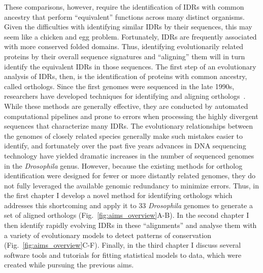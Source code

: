 These comparisons, however, require the identification of IDRs with common ancestry that perform ``equivalent'' functions across many distinct organisms. Given the difficulties with identifying similar IDRs by their sequences, this may seem like a chicken and egg problem. Fortunately, IDRs are frequently associated with more conserved folded domains. Thus, identifying evolutionarily related proteins by their overall sequence signatures and ``aligning'' them will in turn identify the equivalent IDRs in those sequences. The first step of an evolutionary analysis of IDRs, then, is the identification of proteins with common ancestry, called orthologs. Since the first genomes were sequenced in the late 1990s, researchers have developed techniques for identifying and aligning orthologs~\cite{Fleischmann1995, Goffeau1996, CESC1998, Tatusov1997}. While these methods are generally effective, they are conducted by automated computational pipelines and prone to errors when processing the highly divergent sequences that characterize many IDRs. The evolutionary relationships between the genomes of closely related species generally make such mistakes easier to identify, and fortunately over the past five years advances in DNA sequencing technology have yielded dramatic increases in the number of sequenced genomes in the \textit{Drosophila} genus. However, because the existing methods for ortholog identification were designed for fewer or more distantly related genomes, they do not fully leveraged the available genomic redundancy to minimize errors. Thus, in the first chapter I develop a novel method for identifying orthologs which addresses this shortcoming and apply it to 33 \textit{Drosophila} genomes to generate a set of aligned orthologs (Fig.~\ref{fig:aims_overview}A-B). In the second chapter I then identify rapidly evolving IDRs in these ``alignments'' and analyse them with a variety of evolutionary models to detect patterns of conservation (Fig.~\ref{fig:aims_overview}C-F). Finally, in the third chapter I discuss several software tools and tutorials for fitting statistical models to data, which were created while pursuing the previous aims.
